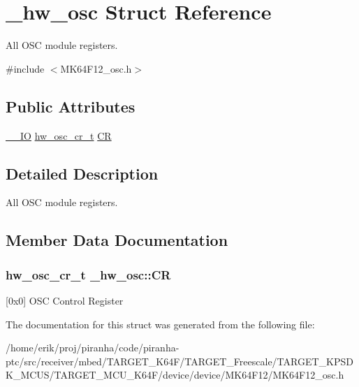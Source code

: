 \hypertarget{struct__hw__osc}{}\section{\+\_\+hw\+\_\+osc Struct Reference}
\label{struct__hw__osc}


All O\+SC module registers.  




{\ttfamily \#include $<$M\+K64\+F12\+\_\+osc.\+h$>$}

\subsection*{Public Attributes}
\begin{DoxyCompactItemize}
\item 
\hyperlink{core__sc300_8h_aec43007d9998a0a0e01faede4133d6be}{\+\_\+\+\_\+\+IO} \hyperlink{union__hw__osc__cr}{hw\+\_\+osc\+\_\+cr\+\_\+t} \hyperlink{struct__hw__osc_ac445eadab7026f663eab0a42ec9e2e13}{CR}
\end{DoxyCompactItemize}


\subsection{Detailed Description}
All O\+SC module registers. 

\subsection{Member Data Documentation}
\subsubsection[{\texorpdfstring{CR}{CR}}]{ {\bf hw\+\_\+osc\+\_\+cr\+\_\+t} \+\_\+hw\+\_\+osc\+::\+CR}\hypertarget{struct__hw__osc_ac445eadab7026f663eab0a42ec9e2e13}{}\label{struct__hw__osc_ac445eadab7026f663eab0a42ec9e2e13}
\mbox{[}0x0\mbox{]} O\+SC Control Register 

The documentation for this struct was generated from the following file\+:\begin{DoxyCompactItemize}
\item 
/home/erik/proj/piranha/code/piranha-\/ptc/src/receiver/mbed/\+T\+A\+R\+G\+E\+T\+\_\+\+K64\+F/\+T\+A\+R\+G\+E\+T\+\_\+\+Freescale/\+T\+A\+R\+G\+E\+T\+\_\+\+K\+P\+S\+D\+K\+\_\+\+M\+C\+U\+S/\+T\+A\+R\+G\+E\+T\+\_\+\+M\+C\+U\+\_\+\+K64\+F/device/device/\+M\+K64\+F12/M\+K64\+F12\+\_\+osc.\+h\end{DoxyCompactItemize}
